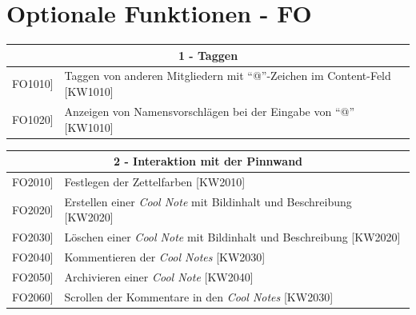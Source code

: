 \documentclass[a4paper]{scrreprt}
\begin{document}
    		\vspace{1cm}
    		\clearpage
    		
    		\section{Optionale Funktionen - FO}
    		
    		\begin{table}[h!]
    			\centering
    			\label{my-label}
    			\begin{tabular}{p{2cm}p{12cm}}
    				
    				\multicolumn{2}{c}{\textbf{1 - Taggen}} \\ \hline
    				\centering{[}FO1010{]} & Taggen von anderen Mitgliedern mit ``@”-Zeichen im Content-Feld {[}KW1010{]}\\
    				\centering{[}FO1020{]}& Anzeigen von Namensvorschlägen bei der Eingabe von ``@” {[}KW1010{]} \\
    				\hline
    			\end{tabular}
    		\end{table}
    		
    		\vspace{5mm}
    		
    		\begin{table}[h!]
    			\centering
    			\label{my-label}
    			\begin{tabular}{p{2cm}p{12cm}}
    				
    				\multicolumn{2}{c}{\textbf{2 - Interaktion mit der Pinnwand}} \\ \hline
    				\centering{[}FO2010{]} & Festlegen der Zettelfarben {[}KW2010{]}\\
    				\centering{[}FO2020{]}& Erstellen einer \textit{Cool Note} mit Bildinhalt und Beschreibung {[}KW2020{]}     \\
    				\centering{[}FO2030{]}& Löschen einer \textit{Cool Note} mit Bildinhalt und Beschreibung {[}KW2020{]}\\ 
    				\centering{[}FO2040{]}& Kommentieren der \textit{Cool Notes} {[}KW2030{]}\\ 
    				\centering{[}FO2050{]}& Archivieren einer \textit{Cool Note} {[}KW2040{]}\\ 
    				\centering{[}FO2060{]}& Scrollen der Kommentare in den \textit{Cool Notes} {[}KW2030{]}\\ 
    				\hline
    			\end{tabular}
    		\end{table}
    		
\end{document}
